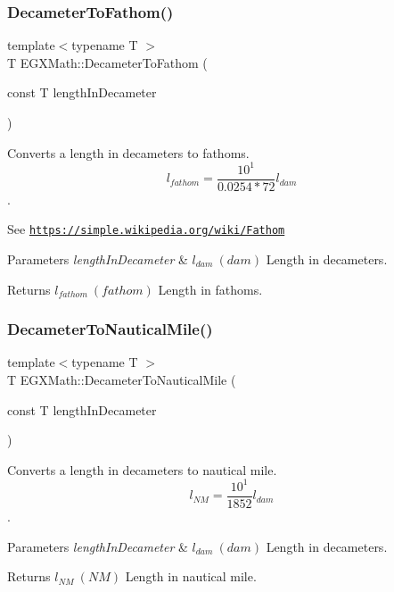 \subsubsection{\texorpdfstring{Decameter\+To\+Fathom()}{DecameterToFathom()}}
{\footnotesize\ttfamily template$<$typename T $>$ \\
T E\+G\+X\+Math\+::\+Decameter\+To\+Fathom (\begin{DoxyParamCaption}\item[{const T}]{length\+In\+Decameter }\end{DoxyParamCaption})}



Converts a length in decameters to fathoms. \[ l_{fathom}= \frac{10^{1}}{0.0254 * 72} l_{dam} \]. 

See \href{https://simple.wikipedia.org/wiki/Fathom}{\tt https\+://simple.\+wikipedia.\+org/wiki/\+Fathom} 
\begin{DoxyParams}{Parameters}
{\em length\+In\+Decameter} & $ l_{dam}\ (dam)$ Length in decameters. \\
\hline
\end{DoxyParams}
\begin{DoxyReturn}{Returns}
$ l_{fathom}\ (fathom)$ Length in fathoms. 
\end{DoxyReturn}
\mbox{\label{group___e_g_x_math-_conversions-_length_conversions-_s_i-_decameter-_nautical_ga099c662953d7c82d538755bd699993b1}} 
\subsubsection{\texorpdfstring{Decameter\+To\+Nautical\+Mile()}{DecameterToNauticalMile()}}
{\footnotesize\ttfamily template$<$typename T $>$ \\
T E\+G\+X\+Math\+::\+Decameter\+To\+Nautical\+Mile (\begin{DoxyParamCaption}\item[{const T}]{length\+In\+Decameter }\end{DoxyParamCaption})}



Converts a length in decameters to nautical mile. \[ l_{NM}= \frac{10^{1}}{1852} l_{dam} \]. 


\begin{DoxyParams}{Parameters}
{\em length\+In\+Decameter} & $ l_{dam}\ (dam)$ Length in decameters. \\
\hline
\end{DoxyParams}
\begin{DoxyReturn}{Returns}
$ l_{NM}\ (NM)$ Length in nautical mile. 
\end{DoxyReturn}
